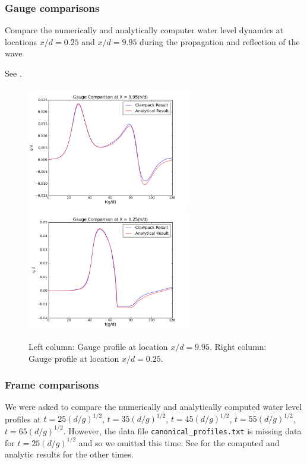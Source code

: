 \subsubsection{Gauge comparisons}
Compare the numerically and analytically computer water level dynamics at locations $x/d = 0.25$ and $x/d = 9.95$ during the propagation and reflection of the wave


See .

\begin{figure}[ht]
\hfil\includegraphics[width=2.8in]{../bp01/canonical-beach/plotgauge2.png}\hfil
\hfil\includegraphics[width=2.8in]{../bp01/canonical-beach/plotgauge1.png}\hfil
\caption{\label{fig:bp1gauges} 
Left column: Gauge profile at location $x/d = 9.95$.
Right column: Gauge profile at location $x/d = 0.25$.
 }
\end{figure}



\subsubsection{Frame comparisons}
We were asked to
compare the numerically and analytically computed water level profiles at $t = 25(d/g)^{1/2}$, $t = 35(d/g)^{1/2}$, $t = 45(d/g)^{1/2}$, $t = 55(d/g)^{1/2}$, $t = 65(d/g)^{1/2}$.
However, the data file {\tt canonical\_profiles.txt} is missing data for
$t=25(d/g)^{1/2}$ and so we omitted this time.
See  for the computed and analytic results for the other
times.

